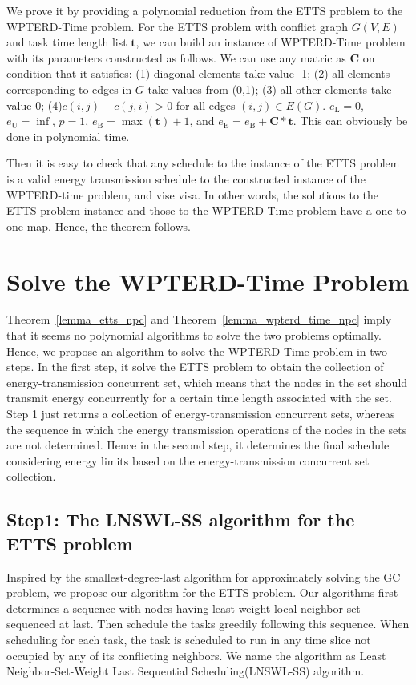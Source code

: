 \documentclass[journal,10pt]{IEEEtran}
\begin{document}
\begin{IEEEproof}
We prove it by providing a polynomial reduction from the ETTS problem to the WPTERD-Time problem. For the ETTS problem with conflict graph $G(V,E)$ and task time length list $\mathbf{t}$, we can build an instance of WPTERD-Time problem with its parameters constructed as follows. We can use any matric as $\mathbf{C}$ on condition that it satisfies: (1) diagonal elements take value -1; (2) all elements corresponding to edges in $G$ take values from (0,1); (3) all other elements take value 0; (4)$c(i,j){+}c(j,i)>0$ for all edges $(i,j){\in}E(G)$. $e_\text{L}{=}0$, $e_\text{U}{=}\inf$, $p{=}1$, $e_\text{B}{=}\max(\mathbf{t}){+}1$, and $e_\text{E}{=}e_\text{B}{+}\mathbf{C}{*}\mathbf{t}$. This can obviously be done in polynomial time.

Then it is easy to check that any schedule to the instance of the ETTS problem is a valid energy transmission schedule to the constructed instance of the WPTERD-time problem, and vise visa. In other words, the solutions to the ETTS problem instance and those to the WPTERD-Time problem have a one-to-one map. Hence, the theorem follows.
\end{IEEEproof}

\section{Solve the WPTERD-Time Problem}
\label{sec_wpter_last}

Theorem~\ref{lemma_etts_npc} and Theorem~\ref{lemma_wpterd_time_npc} imply that it seems no polynomial algorithms to solve the two problems optimally. Hence, we propose an algorithm to solve the WPTERD-Time problem in two steps. In the first step, it solve the ETTS problem to obtain the collection of energy-transmission concurrent set, which means that the nodes in the set should transmit energy concurrently for a certain time length associated with the set. Step 1 just returns a collection of energy-transmission concurrent sets, whereas the sequence in which the energy transmission operations of the nodes in the sets are not determined. Hence in the second step, it determines the final schedule considering energy limits based on the energy-transmission concurrent set collection.

\subsection{Step1: The LNSWL-SS algorithm for the ETTS problem}
Inspired by the smallest-degree-last algorithm for approximately solving the GC problem, we propose our algorithm for the ETTS problem. Our algorithms first determines a sequence with nodes having least weight local neighbor set sequenced at last. Then schedule the tasks greedily following this sequence. When scheduling for each task, the task is scheduled to run in any time slice not occupied by any of its conflicting neighbors. We name the algorithm as Least Neighbor-Set-Weight Last Sequential Scheduling(LNSWL-SS) algorithm.
\end{document}
